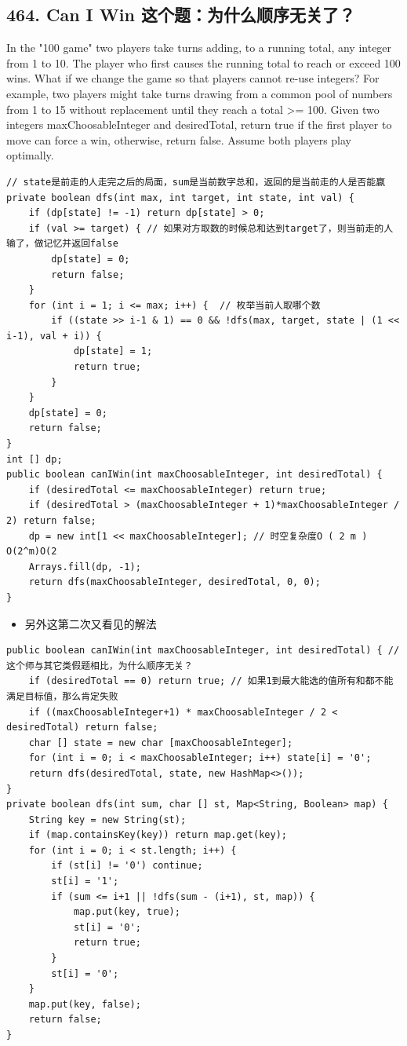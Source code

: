 \documentclass[9pt, b5paaper]{book}
\begin{document}
\subsection{464. Can I Win 这个题：为什么顺序无关了？}
\label{sec-1-1-5}
In the "100 game" two players take turns adding, to a running total, any integer from 1 to 10. The player who first causes the running total to reach or exceed 100 wins.
What if we change the game so that players cannot re-use integers?
For example, two players might take turns drawing from a common pool of numbers from 1 to 15 without replacement until they reach a total >= 100.
Given two integers maxChoosableInteger and desiredTotal, return true if the first player to move can force a win, otherwise, return false. Assume both players play optimally.
\begin{verbatim}
// state是前走的人走完之后的局面，sum是当前数字总和，返回的是当前走的人是否能赢
private boolean dfs(int max, int target, int state, int val) {
    if (dp[state] != -1) return dp[state] > 0;
    if (val >= target) { // 如果对方取数的时候总和达到target了，则当前走的人输了，做记忆并返回false
        dp[state] = 0;
        return false;
    }
    for (int i = 1; i <= max; i++) {  // 枚举当前人取哪个数
        if ((state >> i-1 & 1) == 0 && !dfs(max, target, state | (1 << i-1), val + i)) {
            dp[state] = 1;
            return true;
        }
    }
    dp[state] = 0;
    return false;
}
int [] dp;
public boolean canIWin(int maxChoosableInteger, int desiredTotal) {
    if (desiredTotal <= maxChoosableInteger) return true;
    if (desiredTotal > (maxChoosableInteger + 1)*maxChoosableInteger / 2) return false;
    dp = new int[1 << maxChoosableInteger]; // 时空复杂度O ( 2 m ) O(2^m)O(2 
    Arrays.fill(dp, -1);
    return dfs(maxChoosableInteger, desiredTotal, 0, 0);
}
\end{verbatim}
\begin{itemize}
\item 另外这第二次又看见的解法
\end{itemize}
\begin{verbatim}
public boolean canIWin(int maxChoosableInteger, int desiredTotal) { // 这个师与其它类假题相比，为什么顺序无关？
    if (desiredTotal == 0) return true; // 如果1到最大能选的值所有和都不能满足目标值，那么肯定失败
    if ((maxChoosableInteger+1) * maxChoosableInteger / 2 < desiredTotal) return false;
    char [] state = new char [maxChoosableInteger];
    for (int i = 0; i < maxChoosableInteger; i++) state[i] = '0';
    return dfs(desiredTotal, state, new HashMap<>());
}
private boolean dfs(int sum, char [] st, Map<String, Boolean> map) {
    String key = new String(st);
    if (map.containsKey(key)) return map.get(key);
    for (int i = 0; i < st.length; i++) {
        if (st[i] != '0') continue;
        st[i] = '1';
        if (sum <= i+1 || !dfs(sum - (i+1), st, map)) {
            map.put(key, true);
            st[i] = '0';
            return true;
        }
        st[i] = '0';
    }
    map.put(key, false);
    return false;
}
\end{verbatim}
\end{document}
